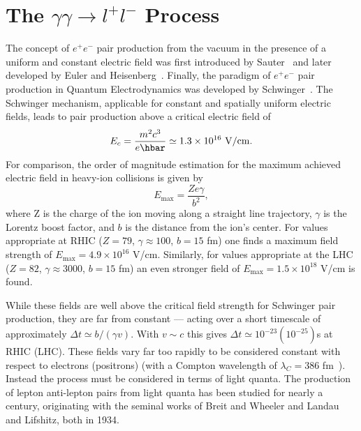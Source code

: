 \documentclass[12pt,epjc3]{svjour3}\sloppy
\begin{document}
\section{The $\gamma\gamma \rightarrow l^+l^-$ Process}
\label{sec:process}
The concept of $e^+e^-$ pair production from the vacuum in the presence of a uniform and constant electric field was first introduced by Sauter~\cite{sauterUeberVerhaltenElektrons1931} and later developed by Euler and Heisenberg~\cite{heisenbergFolgerungenAusDiracschen1936}. Finally, the paradigm of $e^+e^-$ pair production in Quantum Electrodynamics was developed by Schwinger~\cite{schwingerGaugeInvarianceVacuum1951}. The Schwinger mechanism, applicable for constant and spatially uniform electric fields, leads to pair production above a critical electric field of
\begin{equation}
E_c = \frac{m^2c^3}{e\hbar}  \simeq 1.3\times 10^{16}\ {\rm V/cm}.
\end{equation}
For comparison, the order of magnitude estimation for the maximum achieved electric field in heavy-ion collisions is given by\cite{baurCoherentPhotonphotonInteractions2009}
\begin{equation}
    E_\mathrm{max} = \frac{Ze\gamma}{b^2},
\end{equation}
where Z is the charge of the ion moving along a straight line trajectory, $\gamma$ is the Lorentz boost factor, and $b$ is the distance from the ion's center. For values appropriate at RHIC ($Z=79$, $\gamma\approx100$, $b=15$ fm) one finds a maximum field strength of $E_\mathrm{max}=4.9 \times 10^{16}$ V/cm. Similarly, for values appropriate at the LHC ($Z=82$, $\gamma\approx3000$, $b=15$ fm) an even stronger field of $E_\mathrm{max}=1.5\times10^{18}$ V/cm is found. 

While these fields are well above the critical field strength for Schwinger pair production, they are far from constant --- acting over a short timescale of approximately $\Delta t \simeq b/(\gamma v)$. With $v\sim c$ this gives $\Delta t\simeq10^{-23} (10^{-25})$s at RHIC (LHC). These fields vary far too rapidly to be considered constant with respect to electrons (positrons) (with a Compton wavelength of $\lambda_{C} = 386$ fm~\cite{henckenImpactparameterDependenceTotal1995}). Instead the process must be considered in terms of light quanta. The production of lepton anti-lepton pairs from light quanta has been studied for nearly a century, originating with the seminal works of Breit and Wheeler\cite{breitCollisionTwoLight1934} and Landau and Lifshitz\cite{landauCreationElectronsPositrons1934}, both in 1934.
\end{document}

